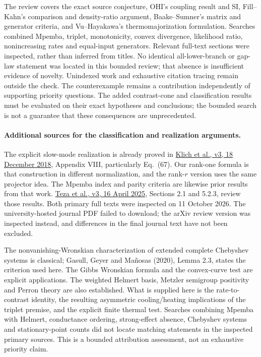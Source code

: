 The review covers the exact source conjecture, OHI's coupling result and SI, Fill--Kahn's comparison and density-ratio argument, Baake--Sumner's matrix and generator criteria, and Vu--Hayakawa's thermomajorization formulation. Searches combined Mpemba, triplet, monotonicity, convex divergence, likelihood ratio, nonincreasing rates and equal-input generators. Relevant full-text sections were inspected, rather than inferred from titles. No identical all-lower-branch or gap-law statement was located in this bounded review; that absence is insufficient evidence of novelty. Unindexed work and exhaustive citation tracing remain outside the check. The counterexample remains a contribution independently of supporting priority questions. The added contrast-cone and classification results must be evaluated on their exact hypotheses and conclusions; the bounded search is not a guarantee that these consequences are unprecedented.

\paragraph{Additional sources for the classification and realization arguments.}
The explicit slow-mode realization is already proved in \href{https://arxiv.org/abs/1711.05829v3}{Klich et al., v3, 18 December 2018}, Appendix VIII, particularly Eq.~(67). Our rank-one formula is that construction in different normalization, and the rank-$r$ version uses the same projector idea. The Mpemba index and parity criteria are likewise prior results from that work. \href{https://arxiv.org/abs/2502.01758v3}{Teza et al., v3, 16 April 2025}, Sections 2.1 and 5.2.3, review those results. Both primary full texts were inspected on 11 October 2026. The university-hosted journal PDF failed to download; the arXiv review version was inspected instead, and differences in the final journal text have not been excluded.

The nonvanishing-Wronskian characterization of extended complete Chebyshev systems is classical; Gasull, Geyer and Ma\~nosas (2020), Lemma 2.3, states the criterion used here. The Gibbs Wronskian formula and the convex-curve test are explicit applications. The weighted Helmert basis, Metzler semigroup positivity and Perron theory are also established. What is supplied here is the rate-to-contrast identity, the resulting asymmetric cooling/heating implications of the triplet premise, and the explicit finite thermal test. Searches combining Mpemba with Helmert, conductance ordering, strong-effect absence, Chebyshev systems and stationary-point counts did not locate matching statements in the inspected primary sources. This is a bounded attribution assessment, not an exhaustive priority claim.

